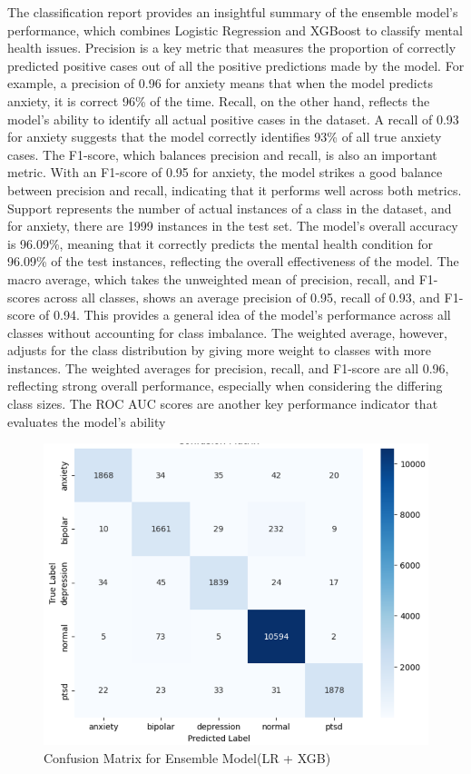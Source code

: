 \noindent
The classification report provides an insightful summary of the ensemble model's performance, which combines Logistic Regression and XGBoost to classify mental health issues. Precision is a key metric that measures the proportion of correctly predicted positive cases out of all the positive predictions made by the model. For example, a precision of 0.96 for anxiety means that when the model predicts anxiety, it is correct 96\% of the time. Recall, on the other hand, reflects the model's ability to identify all actual positive cases in the dataset. A recall of 0.93 for anxiety suggests that the model correctly identifies 93\% of all true anxiety cases. The F1-score, which balances precision and recall, is also an important metric. With an F1-score of 0.95 for anxiety, the model strikes a good balance between precision and recall, indicating that it performs well across both metrics. Support represents the number of actual instances of a class in the dataset, and for anxiety, there are 1999 instances in the test set. The model's overall accuracy is 96.09\%, meaning that it correctly predicts the mental health condition for 96.09\% of the test instances, reflecting the overall effectiveness of the model. The macro average, which takes the unweighted mean of precision, recall, and F1-scores across all classes, shows an average precision of 0.95, recall of 0.93, and F1-score of 0.94. This provides a general idea of the model's performance across all classes without accounting for class imbalance. The weighted average, however, adjusts for the class distribution by giving more weight to classes with more instances. The weighted averages for precision, recall, and F1-score are all 0.96, reflecting strong overall performance, especially when considering the differing class sizes. The ROC AUC scores are another key performance indicator that evaluates the model's ability 

\begin{figure}[h!]  
    \centering
    \includegraphics[width=1.0\textwidth]{Images/EM CM.png}  
    \caption{Confusion Matrix for Ensemble Model(LR + XGB)}
    \label{dfdl3123}  %
\end{figure}

